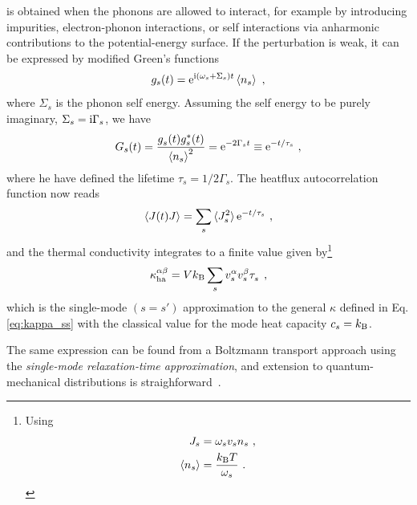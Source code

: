  is obtained when the phonons are allowed to interact, for example by introducing impurities, electron-phonon interactions, or self interactions via anharmonic contributions to the potential-energy surface. If the perturbation is weak, it can be expressed by modified Green's functions~\cite{Negele2018}
\begin{align}
	g_s (t) = {\rm e}^{\im \left( \omega_s + \Sigma_s \right) t} \braket{n_s}~,
	\label{eq:ha.kappa.g.self}
\end{align}
where $\Sigma_s$ is the phonon self energy. Assuming the self energy to be purely imaginary, $\Sigma_s = {\rm i} \Gamma_s$, we have
\begin{align}
	G_{s} (t) = \frac{\fD g_s (t) g^\ast_{s} (t)}{\braket{n_s}^2} = {\rm e}^{- 2 \Gamma_s t}
	\equiv {\rm e}^{-t / \tau_s} ~,
	\label{eq:ha.kappa.gg.Sigma}
\end{align}
where he have defined the lifetime $\tau_s = 1 / 2 \Gamma_s$. The heatflux autocorrelation function now reads
\begin{align}
	\braket{J (t) J} = \sum_s \braket{J_s^2} {\rm e}^{-t / \tau_s}~,
	\label{eq:ha.kappa.JJ.pert}
\end{align}
and the thermal conductivity integrates to a finite value given by\footnote{Using \begin{align*}
		J_s 
			&= \omega_s v_s n_s~,\\
		\braket{n_s} 
			&= \frac{k_{\rm B} T}{\omega_s}~.
	\end{align*}}
\begin{align}
	\kappa_{\rm ha}^{\alpha \beta} = V k_{\rm B} \sum_{s} v^\alpha_s v^{\beta \vphantom{\dagger}}_s \fD \tau_s~,
	\label{eq:ha.kappa.bte}
\end{align}
which is the single-mode $(s=s')$ approximation to the general $\kappa$ defined in Eq.\,\eqref{eq:kappa_ss} with the classical value for the mode heat capacity $c_s = k_{\rm B}$.

The same expression can be found from a Boltzmann transport approach using the \emph{single-mode relaxation-time approximation}, and extension to quantum-mechanical distributions is straighforward~\cite{Srivastava}.


